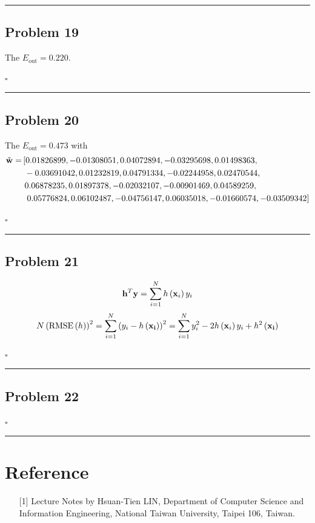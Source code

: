 \documentclass[12pt]{article}
\newcommand*{\QEDB}{\hfill\ensuremath{\square}}
\newcommand{\ParTh}[1]{\left(#1\right)}
\newcommand{\BF}[1]{{\bf#1}}
\newcommand{\horrule}[1]{\rule{\linewidth}{#1}}
\begin{document}
\horrule{0.5pt}

\subsection*{Problem 19}

The $E_{\text{out}}=0.220$.

\QEDB

\horrule{0.5pt}

\subsection*{Problem 20}

The $E_{\text{out}}=0.473$ with
\begin{align}
\tilde{\BF{w}}=&\left[0.01826899, -0.01308051,  0.04072894, -0.03295698,  0.01498363,\right.\\
\nonumber
&~-0.03691042,0.01232819,  0.04791334, -0.02244958,  0.02470544,\\
\nonumber
&~0.06878235,  0.01897378,-0.02032107, -0.00901469,  0.04589259,\\
\nonumber
&~\left.0.05776824,  0.06102487, -0.04756147,0.06035018, -0.01660574, -0.03509342\right]
\end{align}

\QEDB

\horrule{0.5pt}

\subsection*{Problem 21}

\begin{align}
\BF{h}^T\BF{y}=\sum_{i=1}^{N}h\ParTh{\BF{x}_i}y_i
\end{align}
\begin{align}
N\ParTh{\text{RMSE}\ParTh{h}}^2=\sum_{i=1}^{N}\ParTh{y_i-h\ParTh{\BF{x_i}}}^2=\sum_{i=1}^{N}y^2_i-2h\ParTh{\BF{x}_i}y_i+h^2\ParTh{\BF{x_i}}
\end{align}

\QEDB

\horrule{0.5pt}

\subsection*{Problem 22}

\QEDB

\horrule{0.5pt}

\section*{Reference}

\begin{enumerate}

\item[{[1]}] Lecture Notes by Hsuan-Tien LIN, Department of Computer Science and Information Engineering, National Taiwan University, Taipei 106, Taiwan.


\end{enumerate}
\end{document}
